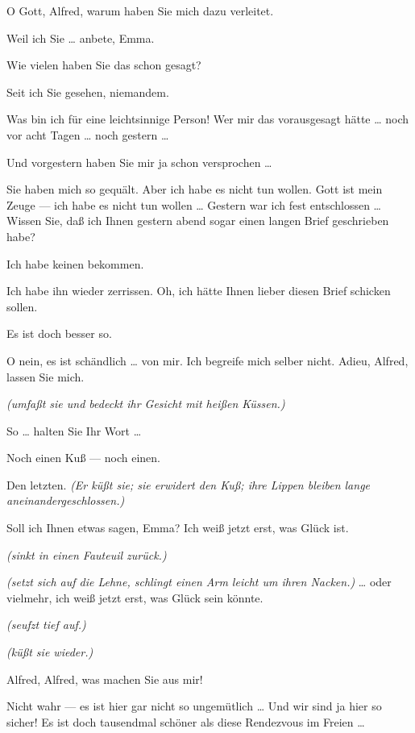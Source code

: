 \documentclass[
	final,
	a4paper,
	ngerman,
	mpinclude = true, %
	twoside = true,
	open = right,
	cleardoublepage = plain,
	DIV = 13,
	BCOR = 1cm,
	titlepage = firstiscover,
	]{scrbook}
\newcommand{\direction}[1]{\textit{(#1)}}
\newcommand{\thecharacter}[1]{\textup{\textsc{#1}}}
\newcommand{\theherr}{\thecharacter{Junger Herr}}
\newcommand{\thefrau}{\thecharacter{Junge Frau}}
\newcommand{\character}[1]{\item[#1:]}
\newcommand{\herr}{\character{\theherr}}
\newcommand{\frau}{\character{\thefrau}}
\begin{document}
\begin{play}
	\frau
	O Gott, Alfred, warum haben Sie mich dazu verleitet.

	\herr
	Weil ich Sie \ldots{} anbete, Emma.

	\frau
	Wie vielen haben Sie das schon gesagt?

	\herr
	Seit ich Sie gesehen, niemandem.

	\frau
	Was bin ich für eine leichtsinnige Person! Wer mir das vorausgesagt hätte \ldots{} noch vor acht Tagen \ldots{} noch gestern \ldots{}

	\herr
	Und vorgestern haben Sie mir ja schon versprochen \ldots{}

	\frau
	Sie haben mich so gequält. Aber ich habe es nicht tun wollen. Gott ist mein Zeuge --- ich habe es nicht tun wollen \ldots{} Gestern war ich fest entschlossen \ldots{} Wissen Sie, daß ich Ihnen gestern abend sogar einen langen Brief geschrieben habe?

	\herr
	Ich habe keinen bekommen.

	\frau
	Ich habe ihn wieder zerrissen. Oh, ich hätte Ihnen lieber diesen Brief schicken sollen.

	\herr
	Es ist doch besser so.

	\frau
	O nein, es ist schändlich \ldots{} von mir. Ich begreife mich selber nicht. Adieu, Alfred, lassen Sie mich.

	\herr
	\direction{umfaßt sie und bedeckt ihr Gesicht mit heißen Küssen.}

	\frau
	So \ldots{} halten Sie Ihr Wort \ldots{}

	\herr
	Noch einen Kuß --- noch einen.

	\frau
	Den letzten. \direction{Er küßt sie; sie erwidert den Kuß; ihre Lippen bleiben lange aneinandergeschlossen.}

	\herr
	Soll ich Ihnen etwas sagen, Emma? Ich weiß jetzt erst, was Glück ist.

	\frau
	\direction{sinkt in einen Fauteuil zurück.}

	\herr
	\direction{setzt sich auf die Lehne, schlingt einen Arm leicht um ihren Nacken.} \ldots{} oder vielmehr, ich weiß jetzt erst, was Glück sein könnte.

	\frau
	\direction{seufzt tief auf.}

	\herr
	\direction{küßt sie wieder.}

	\frau
	Alfred, Alfred, was machen Sie aus mir!

	\herr
	Nicht wahr --- es ist hier gar nicht so ungemütlich \ldots{} Und wir sind ja hier so sicher! Es ist doch tausendmal schöner als diese Rendezvous im Freien \ldots{}


\end{play}
\end{document}
